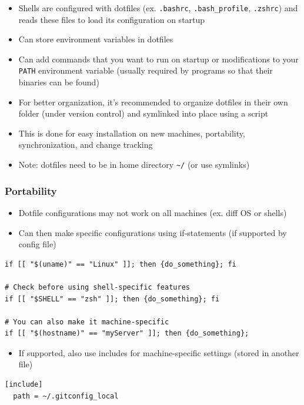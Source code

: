 \documentclass[letterpaper,12pt]{article}
\begin{document}
\begin{itemize}
 \item Shells are configured with dotfiles (ex. \lstinline{.bashrc}, \lstinline{.bash_profile}, \lstinline{.zshrc}) and reads these files to load its configuration on startup
 \item Can store environment variables in dotfiles
 \item Can add commands that you want to run on startup or modifications to your \lstinline{PATH} environment variable (usually required by programs so that their binaries can be found)
 \item For better organization, it's recommended to organize dotfiles in their own folder (under version control) and symlinked into place using a script
 \item This is done for easy installation on new machines, portability, synchronization, and change tracking
 \item Note: dotfiles need to be in home directory \lstinline{~/} (or use symlinks)
\end{itemize}

\subsubsection{Portability}

\begin{itemize}
 \item Dotfile configurations may not work on all machines (ex. diff OS or shells)
 \item Can then make specific configurations using if-statements (if supported by config file)
\end{itemize}

\begin{lstlisting}
if [[ "$(uname)" == "Linux" ]]; then {do_something}; fi

# Check before using shell-specific features
if [[ "$SHELL" == "zsh" ]]; then {do_something}; fi

# You can also make it machine-specific
if [[ "$(hostname)" == "myServer" ]]; then {do_something};
\end{lstlisting}

\begin{itemize}
 \item If supported, also use includes for machine-specific settings (stored in another file)
\end{itemize}

\begin{lstlisting}
[include]
  path = ~/.gitconfig_local
\end{lstlisting}
\end{document}
